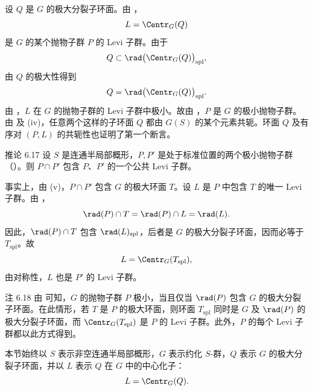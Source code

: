 设 \(Q\) 是 \(G\) 的极大分裂子环面。由 ，
\[
 L=\Centr_G(Q)
\]
是 \(G\) 的某个抛物子群 \(P\) 的 Levi 子群。由于
\[
 Q\subset\rad\bigl(\Centr_G(Q)\bigr)_{\mathrm{spl}},
\]
由 \(Q\) 的极大性得到
\[
 Q=\rad\bigl(\Centr_G(Q)\bigr)_{\mathrm{spl}}.
\]
由 ，\(L\) 在 \(G\) 的抛物子群的 Levi 子群中极小。故由 ，\(P\) 是 \(G\) 的极小抛物子群。由  及 \textup{(iv)}，任意两个这样的子环面 \(Q\) 都由 \(G(S)\) 的某个元素共轭。环面 \(Q\) 及有序对 \((P,L)\) 的共轭性也证明了第一个断言。

\begin{sgastatement}{推论 6.17}
设 \(S\) 是连通半局部概形，\(P,P'\) 是处于标准位置的两个极小抛物子群 \textup{（）}。则 \(P\cap P'\) 包含 \(P\)、\(P'\) 的一个公共 Levi 子群。
\end{sgastatement}

事实上，由 \textup{(v)}，\(P\cap P'\) 包含 \(G\) 的极大环面 \(T\)。设 \(L\) 是 \(P\) 中包含 \(T\) 的唯一 Levi 子群。由 ，
\[
 \rad(P)\cap T=\rad(P)\cap L=\rad(L).
\]
因此，\(\rad(P)\cap T\) 包含 \(\rad(L)_{\mathrm{spl}}\)，后者是 \(G\) 的极大分裂子环面，因而必等于 \(T_{\mathrm{spl}}\)。故
\[
 L=\Centr_G(T_{\mathrm{spl}}),
\]
由对称性，\(L\) 也是 \(P'\) 的 Levi 子群。

\begin{sgastatement}{注 6.18}
由  可知，\(G\) 的抛物子群 \(P\) 极小，当且仅当 \(\rad(P)\) 包含 \(G\) 的极大分裂子环面。在此情形，若 \(T\) 是 \(P\) 的极大环面，则环面 \(T_{\mathrm{spl}}\) 同时是 \(G\) 及 \(\rad(P)\) 的极大分裂子环面，而 \(\Centr_G(T_{\mathrm{spl}})\) 是 \(P\) 的 Levi 子群。此外，\(P\) 的每个 Levi 子群都以此方式得到。
\end{sgastatement}



本节始终以 \(S\) 表示非空连通半局部概形，\(G\) 表示约化 \(S\)-群，\(Q\) 表示 \(G\) 的极大分裂子环面，并以 \(L\) 表示 \(Q\) 在 \(G\) 中的中心化子：
\[
 L=\Centr_G(Q).
\]

